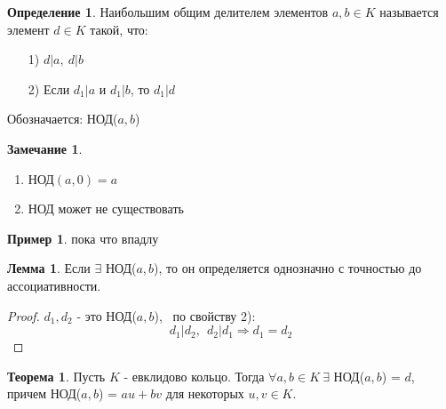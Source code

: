 \documentclass[a4paper, 12pt]{article}
\newcommand\tab[1][.5cm]{\hspace*{#1}}
\theoremstyle{definition}
\newtheorem*{definition}{Определение}
\newtheorem*{theorem}{Теорема}
\newtheorem*{lemma}{Лемма}
\newtheorem*{remark}{Замечание}
\newtheorem*{example1}{Пример}
\begin{document}
  \begin{definition}
    Наибольшим общим делителем элементов $a,b \in K$ называется элемент $d \in K$ такой, что: 
    \begin{enumerate}
      \item[1)] $d|a, \ d|b$
      \item[2)] Если $d_1|a$ и $d_1|b$, то $d_1|d$     
    \end{enumerate}
    Обозначается: НОД($a,b$) 
  \end{definition}
  \begin{remark}\tab
    \begin{enumerate}
      \item НОД$(a,0) = a$
      \item НОД может не существовать
    \end{enumerate}
  \end{remark}
  \begin{example1}
    пока что впадлу
  \end{example1}
  \begin{lemma}
    Если $\exists$ НОД($a,b$), то он определяется однозначно с точностью до ассоциативности.
  \end{lemma}
  \begin{proof}
    $d_1, d_2$ - это НОД($a,b$), \ по свойству 2): 
    $$d_1|d_2, \ \ d_2|d_1 \Longrightarrow d_1 = d_2$$   
  \end{proof}
  \begin{theorem}
    Пусть $K$ - евклидово кольцо. Тогда $\forall a, b \in K \ \exists$ НОД($a,b$) = $d$, причем НОД($a,b$) = $au + bv$ для некоторых $u, v \in K$.     
  \end{theorem}
\end{document}
